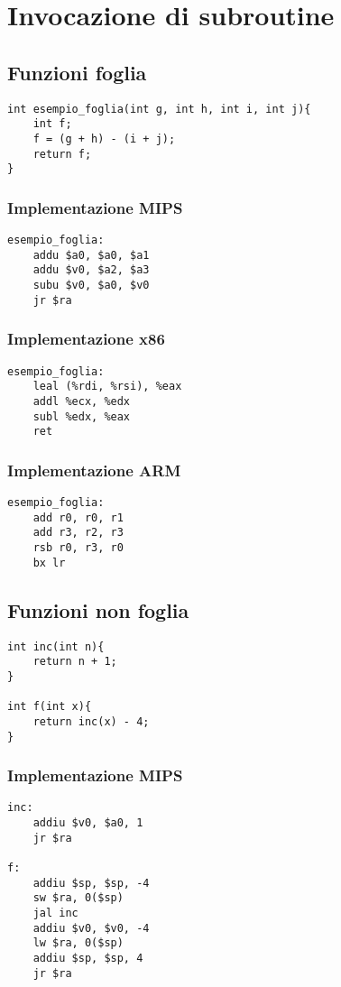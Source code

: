 \documentclass[class=book, crop=false, oneside]{standalone}
\begin{document}
\section{Invocazione di subroutine}
\subsection*{Funzioni foglia}

\begin{verbatim}
int esempio_foglia(int g, int h, int i, int j){
	int f;
	f = (g + h) - (i + j);
	return f;
}
\end{verbatim}

\subsubsection{Implementazione MIPS}
\begin{verbatim}
esempio_foglia:
	addu $a0, $a0, $a1
	addu $v0, $a2, $a3
	subu $v0, $a0, $v0
	jr $ra
\end{verbatim}

\subsubsection{Implementazione x86}
\begin{verbatim}
esempio_foglia:
	leal (%rdi, %rsi), %eax
	addl %ecx, %edx
	subl %edx, %eax
	ret
\end{verbatim}

\subsubsection{Implementazione ARM}
\begin{verbatim}
esempio_foglia:
	add r0, r0, r1
	add r3, r2, r3
	rsb r0, r3, r0
	bx lr
\end{verbatim}

\subsection*{Funzioni non foglia}

\begin{verbatim}
int inc(int n){
	return n + 1;
}

int f(int x){
	return inc(x) - 4;
}
\end{verbatim}

\subsubsection{Implementazione MIPS}
\begin{verbatim}
inc:
	addiu $v0, $a0, 1
	jr $ra

f:
	addiu $sp, $sp, -4
	sw $ra, 0($sp)
	jal inc
	addiu $v0, $v0, -4
	lw $ra, 0($sp)
	addiu $sp, $sp, 4
	jr $ra
\end{verbatim}
\end{document}
